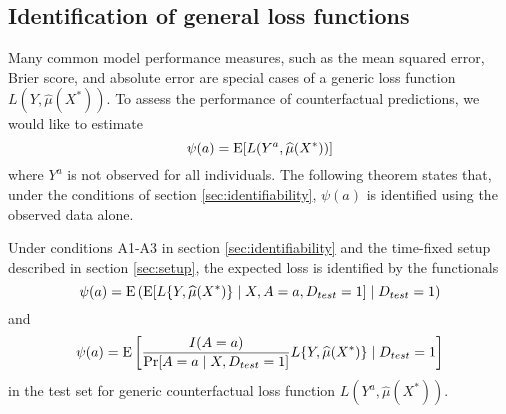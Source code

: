     \subsection{Identification of general loss functions}\label{sec:tf_proof}
    Many common model performance measures, such as the mean squared error, Brier score, and absolute error are special cases of a generic loss function $L(Y, \widehat{\mu}(X^*))$. To assess the performance of counterfactual predictions, we would like to estimate 
    $$\psi(a) = \operatorname{E}[L(Y^a, \widehat{\mu}(X^*))]$$
    where $Y^a$ is not observed for all individuals. The following theorem states that, under the conditions of section \ref{sec:identifiability}, $\psi(a)$ is identified using the observed data alone. 
    \begin{theorem}
        Under conditions A1-A3 in section \ref{sec:identifiability} and the time-fixed setup described in section \ref{sec:setup}, the expected loss is identified by the functionals
        \begin{equation}\label{eqn:app_cl_estimand}
            \psi(a) = \operatorname{E}\left(\operatorname{E}[L\{Y, \widehat{\mu}(X^*)\} \mid X, A=a, D_{test} = 1] \mid D_{test} = 1\right)
        \end{equation}
        and 
        \begin{equation}\label{eqn:app_ipw_estimand}
            \psi(a) = \operatorname{E}\left[\frac{I(A = a)}{\Pr[A = a \mid X, D_{test} = 1]}L\{Y, \widehat{\mu}(X^*)\} \mid D_{test} = 1\right]
        \end{equation}
        in the test set for generic counterfactual loss function $L(Y^{a}, \widehat{\mu}(X^*))$.
    \end{theorem}
    
